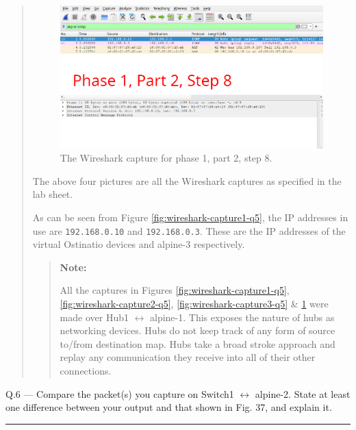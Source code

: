 \documentclass{article}
\newcommand\Que[2]{%
\begin{samepage}
\leavevmode\par
\noindent
Q.#1 --- #2\par\vspace{10pt}\hrule\vspace{10pt}
\end{samepage}}
\newenvironment{ans}
{\fbox{Answer}\begin{quote}\nopagebreak}
{\end{quote}}
\newenvironment{note}{%
\begin{quote}
\begin{tcolorbox}[colback=gray!10,arc=0mm,boxrule=0pt]
\raggedright
\textbf{Note:}%
}{%
\end{tcolorbox}
\end{quote}%
}
\begin{document}
\begin{ans}
\begin{figure}[H]
\centering
\includegraphics[width=14cm]{data/q5-capture4.png}
\caption{The Wireshark capture for phase 1, part 2, step 8.}
\label{fig:wireshark-capture4-q5}
\end{figure}

The above four pictures are all the Wireshark captures as
specified in the lab sheet.

As can be seen from Figure \ref{fig:wireshark-capture1-q5}, the
IP addresses in use are \texttt{192.168.0.10} and
\texttt{192.168.0.3}. These are the IP addresses of the virtual
Ostinatio devices and alpine-3 respectively.

\begin{note}
All the captures in Figures \ref{fig:wireshark-capture1-q5},
\ref{fig:wireshark-capture2-q5}, \ref{fig:wireshark-capture3-q5}
\& \ref{fig:wireshark-capture4-q5} were made over Hub1
$\leftrightarrow$ alpine-1. This exposes the nature of hubs as
networking devices. Hubs do not keep track of any form of source
to/from destination map. Hubs take a broad stroke approach and
replay any communication they receive into all of their other
connections.
\end{note}
\end{ans}

\Que{6}{Compare the packet(s) you capture on Switch1
$\leftrightarrow$ alpine-2. State at least one difference
between your output and that shown in Fig. 37, and explain it.}
\end{document}
